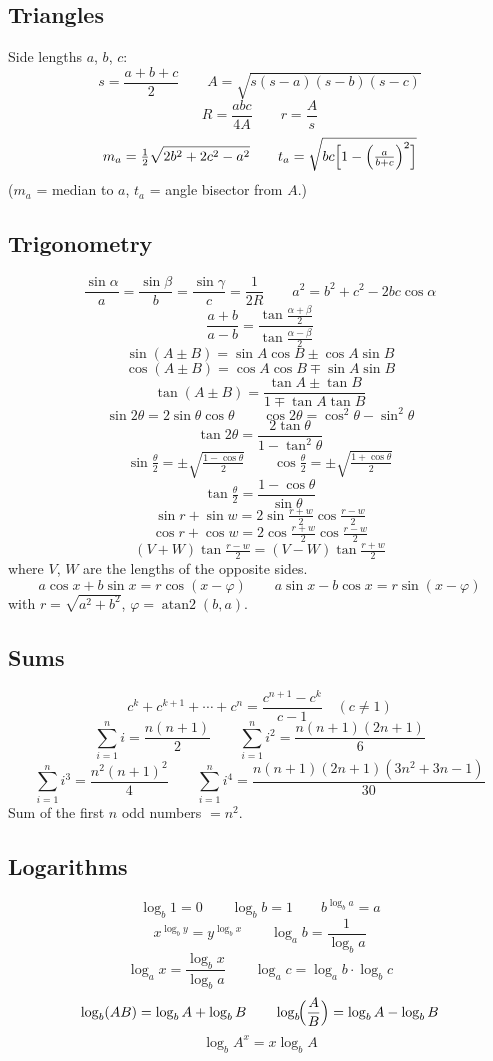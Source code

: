 \subsection{Triangles}
\noindent Side lengths $a$, $b$, $c$:
\[s=\frac{a+b+c}{2}\qquad A=\sqrt{s(s-a)(s-b)(s-c)}\]
\[R=\frac{abc}{4A}\qquad r=\frac{A}{s}\]
\[m_a=\tfrac{1}{2}\sqrt{2b^2+2c^2-a^2}\qquad
  t_a=\sqrt{bc\Bigl[1-\Bigl(\tfrac{a}{b+c}\Bigr)^{2}\Bigr]}\]
\noindent($m_a$ = median to $a$, $t_a$ = angle bisector from $A$.)

\subsection{Trigonometry}
\[\frac{\sin\alpha}{a}=\frac{\sin\beta}{b}=\frac{\sin\gamma}{c}=\frac{1}{2R}
  \qquad a^2=b^2+c^2-2bc\cos\alpha\]
\[\frac{a+b}{a-b}=\frac{\tan\frac{\alpha+\beta}{2}}{\tan\frac{\alpha-\beta}{2}}\]
\[\sin(A\pm B)=\sin A\cos B\pm\cos A\sin B\]
\[\cos(A\pm B)=\cos A\cos B\mp\sin A\sin B\]
\[\tan(A\pm B)=\frac{\tan A\pm\tan B}{1\mp\tan A\tan B}\]
\[\sin2\theta=2\sin\theta\cos\theta\qquad
  \cos2\theta=\cos^2\theta-\sin^2\theta\]
\[\tan2\theta=\frac{2\tan\theta}{1-\tan^2\theta}\]
\[\sin\tfrac{\theta}{2}=\pm\sqrt{\tfrac{1-\cos\theta}{2}}\qquad
  \cos\tfrac{\theta}{2}=\pm\sqrt{\tfrac{1+\cos\theta}{2}}\]
\[\tan\tfrac{\theta}{2}=\frac{1-\cos\theta}{\sin\theta}\]
\[\sin r+\sin w=2\sin\tfrac{r+w}{2}\cos\tfrac{r-w}{2}\]
\[\cos r+\cos w=2\cos\tfrac{r+w}{2}\cos\tfrac{r-w}{2}\]
\[(V+W)\tan\tfrac{r-w}{2}=(V-W)\tan\tfrac{r+w}{2}\]
\noindent where $V$, $W$ are the lengths of the opposite sides.
\[a\cos x+b\sin x=r\cos(x-\varphi)\qquad
  a\sin x-b\cos x=r\sin(x-\varphi)\]
\noindent with $r=\sqrt{a^2+b^2}$, $\varphi=\operatorname{atan2}(b,a)$.

\subsection{Sums}
\[c^k+c^{k+1}+\cdots+c^n=\frac{c^{n+1}-c^k}{c-1}\quad (c\neq 1)\]
\[\sum_{i=1}^{n} i=\frac{n(n+1)}{2}\qquad
  \sum_{i=1}^{n} i^2=\frac{n(n+1)(2n+1)}{6}\]
\[\sum_{i=1}^{n} i^3=\frac{n^2(n+1)^2}{4}\qquad
  \sum_{i=1}^{n} i^4=\frac{n(n+1)(2n+1)(3n^2+3n-1)}{30}\]
\noindent Sum of the first $n$ odd numbers $=n^2$.

\subsection{Logarithms}
\[\log_b 1=0\qquad \log_b b=1\qquad b^{\log_b a}=a\]
\[x^{\log_b y}=y^{\log_b x}\qquad \log_a b=\frac{1}{\log_b a}\]
\[\log_a x=\frac{\log_b x}{\log_b a}\qquad \log_a c=\log_a b\cdot\log_b c\]
\[\log_b(AB)=\log_b A+\log_b B\qquad
  \log_b\!\Bigl(\frac{A}{B}\Bigr)=\log_b A-\log_b B\]
\[\log_b A^x=x\log_b A\]

